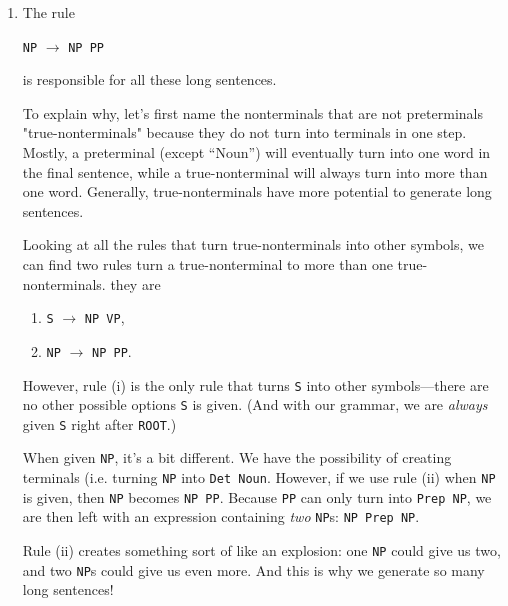 \documentclass[11pt]{article}
\newcommand{\code}[1]{\texttt{#1}}
\begin{document}
\begin{enumerate}
\item 
	The rule 
	\begin{center} \code{NP} $\to$ \code{NP PP} \end{center}
	is responsible for all these long sentences. 
	
To explain why, let's first name the nonterminals that are not preterminals "true-nonterminals" because they do not turn into terminals in one step. Mostly, a preterminal (except ``Noun'') will eventually turn into one word in the final sentence, while a true-nonterminal will always turn into more than one word. Generally, true-nonterminals have more potential to generate long sentences.

Looking at all the rules that turn true-nonterminals into other symbols, we can find two rules turn a true-nonterminal to more than one true-nonterminals. they are 
\begin{enumerate}[label=(\roman*)]
\item \code{S} $\to$ \code{NP VP},
\item \code{NP} $\to$ \code{NP PP}.
\end{enumerate}
However, rule (i) is the only rule that turns \code{S} into other symbols---there are no other possible options  \code{S} is given. (And with our grammar, we are \textit{always} given \code{S} right after \code{ROOT}.) 

When given \code{NP}, it's a bit different. We have the possibility of creating terminals (i.e. turning \code{NP} into \code{Det Noun}. However, if we use rule (ii) when \code{NP} is given, then \code{NP} becomes \code{NP PP}. Because \code{PP} can only turn into \code{Prep NP}, we are then left with an expression containing \textit{two} \code{NP}s: \code{NP Prep NP}. 

Rule (ii) creates something sort of like an explosion: one \code{NP} could give us two, and two \code{NP}s could give us even more. And this is why we generate so many long sentences!


\end{enumerate}
\end{document}
